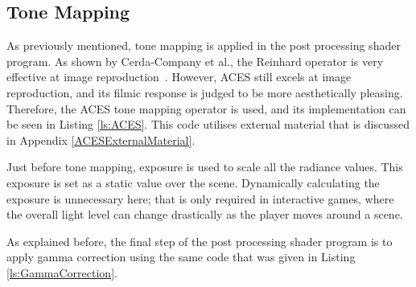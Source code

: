 
\subsection{Tone Mapping} \label{ToneMappingImplementation}

As previously mentioned, tone mapping is applied in the post processing shader program. As shown by Cerda-Company et al., the Reinhard operator is very effective at image reproduction~\cite{ComparingToneMappingOperators}. However, ACES still excels at image reproduction, and its filmic response is judged to be more aesthetically pleasing. Therefore, the ACES tone mapping operator is used, and its implementation can be seen in Listing \ref{ls:ACES}. This code utilises external material that is discussed in Appendix \ref{ACESExternalMaterial}.

Just before tone mapping, exposure is used to scale all the radiance values. This exposure is set as a static value over the scene. Dynamically calculating the exposure is unnecessary here; that is only required in interactive games, where the overall light level can change drastically as the player moves around a scene.

As explained before, the final step of the post processing shader program is to apply gamma correction using the same code that was given in Listing \ref{ls:GammaCorrection}.

